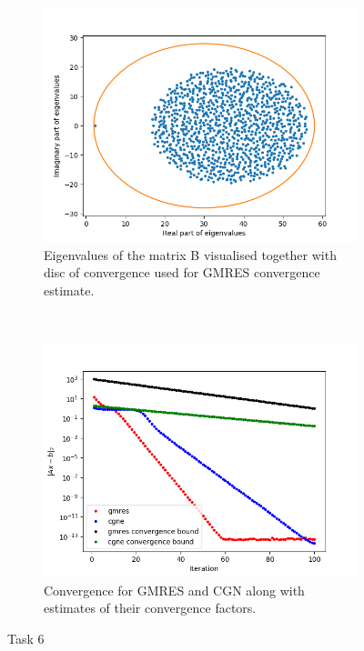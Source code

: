 \begin{figure}[h!]
	\centering
	\begin{subfigure}[t]{0.49\textwidth}
		\includegraphics[width=\textwidth]{Eigens.png}
		\caption{Eigenvalues of the matrix B visualised together with disc of convergence used for GMRES convergence estimate.}
	\end{subfigure}~
	\begin{subfigure}[t]{0.49\textwidth}
		\includegraphics[width=\textwidth]{error_bound.png}
		\caption{Convergence for GMRES and CGN along with estimates of their convergence factors.}
	\end{subfigure}
	\caption{Task 6}
	\label{task6b}
\end{figure}

